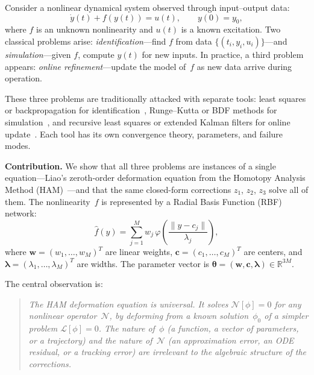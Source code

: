 \documentclass[11pt,a4paper]{article}
\begin{document}
Consider a nonlinear dynamical system observed through input--output data:
\begin{equation}
\dot{y}(t) + f(y(t)) = u(t), \qquad y(0) = y_0,
\label{eq:ode}
\end{equation}
where $f$ is an unknown nonlinearity and $u(t)$ is a known excitation. Two classical problems arise: \emph{identification}---find $f$ from data $\{(t_i, y_i, u_i)\}$---and \emph{simulation}---given $f$, compute $y(t)$ for new inputs. In practice, a third problem appears: \emph{online refinement}---update the model of~$f$ as new data arrive during operation.

These three problems are traditionally attacked with separate tools: least squares or backpropagation for identification~\cite{Haykin2009,Park1991}, Runge--Kutta or BDF methods for simulation~\cite{Hairer1993}, and recursive least squares or extended Kalman filters for online update~\cite{Ljung1999}. Each tool has its own convergence theory, parameters, and failure modes.

\textbf{Contribution.} We show that all three problems are instances of a single equation---Liao's zeroth-order deformation equation from the Homotopy Analysis Method (HAM)~\cite{Liao2003,Liao2012}---and that the same closed-form corrections $z_1$, $z_2$, $z_3$ solve all of them. The nonlinearity~$f$ is represented by a Radial Basis Function (RBF) network:
\begin{equation}
\hat{f}(y) = \sum_{j=1}^{M} w_j\,\varphi\!\left(\frac{\|y - c_j\|}{\lambda_j}\right),
\label{eq:rbf}
\end{equation}
where $\mathbf{w} = (w_1,\ldots,w_M)^T$ are linear weights, $\mathbf{c} = (c_1,\ldots,c_M)^T$ are centers, and $\boldsymbol{\lambda} = (\lambda_1,\ldots,\lambda_M)^T$ are widths. The parameter vector is $\boldsymbol{\theta} = (\mathbf{w}, \mathbf{c}, \boldsymbol{\lambda}) \in \mathbb{R}^{3M}$.

The central observation is:

\begin{quote}
\emph{The HAM deformation equation is universal. It solves $\mathcal{N}[\phi] = 0$ for any nonlinear operator~$\mathcal{N}$, by deforming from a known solution~$\phi_0$ of a simpler problem $\mathcal{L}[\phi] = 0$. The nature of~$\phi$ (a function, a vector of parameters, or a trajectory) and the nature of~$\mathcal{N}$ (an approximation error, an ODE residual, or a tracking error) are irrelevant to the algebraic structure of the corrections.}
\end{quote}
\end{document}
